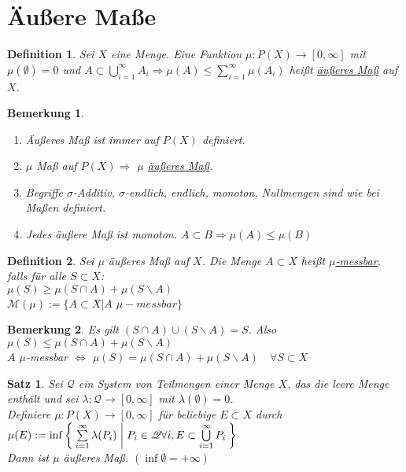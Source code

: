 \documentclass[11pt]{memoir}
\theoremstyle{changebreak}
\newtheorem{Definition}{Definition}[chapter]
\newtheorem{Bemerkung}{Bemerkung}[chapter]
\newtheorem{Satz}{Satz}[chapter]
\begin{document}
\section{Äußere Maße}

\begin{Definition}
Sei $X$ eine Menge. Eine Funktion $\mu: P(X) \rightarrow [0, \infty]$ mit $\mu(\emptyset) = 0$ und $A \subset \bigcup\limits_{i=1}^\infty A_i \Rightarrow \mu(A) \leq \sum\limits_{i=1}^\infty \mu(A_i)$ heißt \underline{äußeres Maß} auf $X$.
\end{Definition}

\begin{Bemerkung}
\begin{enumerate}
	\item Äußeres Maß ist immer auf $P(X)$ definiert.
	\item $\mu$ Maß auf $P(X) \Rightarrow$ $\mu$ \underline{äußeres Maß}.
	\item Begriffe $\sigma$-Additiv, $\sigma$-endlich, endlich, monoton, Nullmengen sind wie bei Maßen definiert.
	\item Jedes äußere Maß ist monoton. $A \subset B \Rightarrow \mu(A) \leq \mu(B)$
\end{enumerate}
\end{Bemerkung}

\begin{Definition}
Sei $\mu$ äußeres Maß auf $X$. Die Menge $A \subset X$ heißt \underline{$\mu$-messbar}, falls für alle $S \subset X$: \\
$\mu(S) \geq \mu(S \cap A) + \mu(S \backslash A)$ \\
$\mathscr M(\mu):= \{ A \subset X | A$ $ \mu-messbar \}$
\end{Definition}

\begin{Bemerkung}
Es gilt $(S \cap A) \cup (S \backslash A) = S$. Also $\mu(S) \leq \mu(S \cap A) + \mu(S \backslash A)$ \\
$A$ $\mu$-messbar $\Leftrightarrow$ $\mu(S) = \mu(S \cap A) + \mu(S \backslash A)\quad \forall S \subset X$
\end{Bemerkung}

\begin{Satz}
Sei $\mathscr Q$ ein System von Teilmengen einer Menge $X$, das die leere Menge enthält und sei $\lambda: \mathscr Q \rightarrow [0, \infty]$ mit $\lambda(\emptyset) = 0$.\\
Definiere $\mu: P(X) \rightarrow [0, \infty]$ für beliebige $E \subset X$ durch \\
 $\mu(E) := \inf \Set{ \sum\limits_{i=1}^\infty \lambda(P_i) | P_i \in \mathscr Q \forall i, E \subset \bigcup\limits_{i=1}^\infty P_i }$ \\
Dann ist $\mu$ äußeres Maß. $(\inf \emptyset = + \infty)$
\end{Satz}
\end{document}
